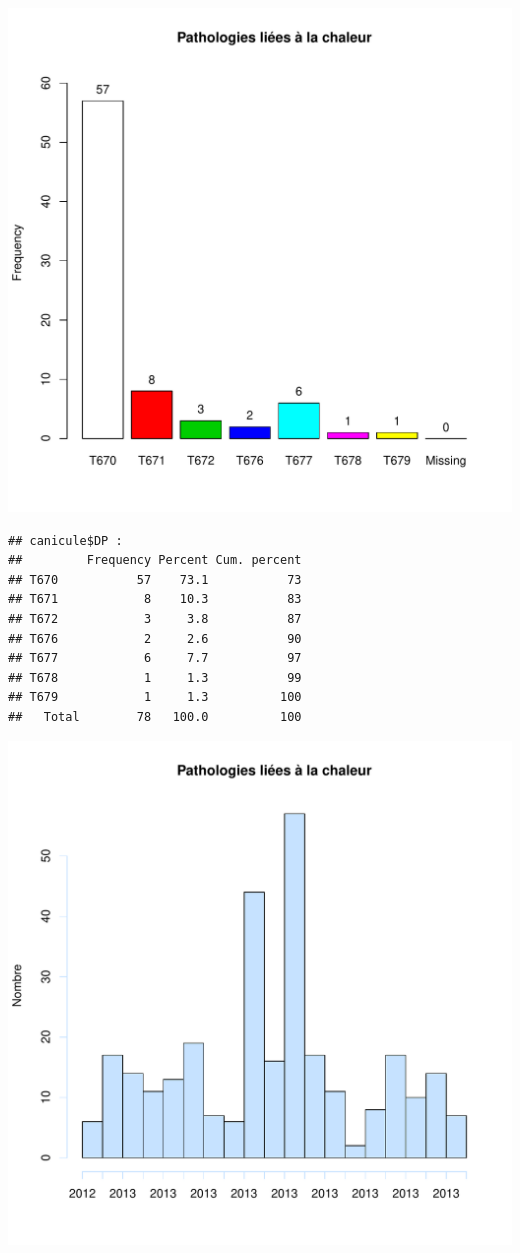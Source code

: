 \documentclass[12pt,english,french,twoside]{book}\usepackage[]{graphicx}\usepackage[]{color}
\makeatletter
\def\maxwidth{ %
  \ifdim\Gin@nat@width>\linewidth
    \linewidth
  \else
    \Gin@nat@width
  \fi
}
\newenvironment{kframe}{%
 \def\at@end@of@kframe{}%
 \ifinner\ifhmode%
  \def\at@end@of@kframe{\end{minipage}}%
  \begin{minipage}{\columnwidth}%
 \fi\fi%
 \def\FrameCommand##1{\hskip\@totalleftmargin \hskip-\fboxsep
 \colorbox{shadecolor}{##1}\hskip-\fboxsep
     \hskip-\linewidth \hskip-\@totalleftmargin \hskip\columnwidth}%
 \MakeFramed {\advance\hsize-\width
   \@totalleftmargin\z@ \linewidth\hsize
   \@setminipage}}%
 {\par\unskip\endMakeFramed%
 \at@end@of@kframe}
\newenvironment{knitrout}{}{} %
\makeatother
\begin{document}
\begin{knitrout}
\includegraphics[width=\maxwidth]{figure/canicule2} 
\begin{kframe}\begin{verbatim}
## canicule$DP : 
##         Frequency Percent Cum. percent
## T670           57    73.1           73
## T671            8    10.3           83
## T672            3     3.8           87
## T676            2     2.6           90
## T677            6     7.7           97
## T678            1     1.3           99
## T679            1     1.3          100
##   Total        78   100.0          100
\end{verbatim}
\end{kframe}
\includegraphics[width=\maxwidth]{figure/canicule3} 

\end{knitrout}
\end{document}
